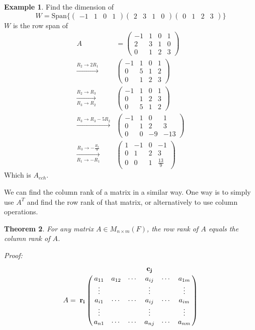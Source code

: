 \documentclass{report}
\newtheorem{theorem}{Theorem}[subsection]
\theoremstyle{remark}
\theoremstyle{definition}
\theoremstyle{definition}
\newtheorem{example}[theorem]{Example}
\theoremstyle{theorem}
\begin{document}
\begin{example}
Find the dimension of
\[W = \text{Span}\{\begin{pmatrix}-1&1&0&1\end{pmatrix}\begin{pmatrix}2&3&1&0\end{pmatrix}\begin{pmatrix}0&1&2&3\end{pmatrix}\}\]
$W$ is the row span of
\begin{align*}
A &= \begin{pmatrix}-1&1&0&1\\
2&3&1&0\\
0&1&2&3
\end{pmatrix}\\
\xrightarrow{R_2 \rightarrow 2R_1} &\begin{pmatrix}
-1&1&0&1\\
0&5&1&2\\
0&1&2&3
\end{pmatrix}\\
\xrightarrow[R_3 \rightarrow R_2]{R_2 \rightarrow R_3} & \begin{pmatrix}
-1&1&0&1\\
0&1&2&3\\
0&5&1&2
\end{pmatrix}\\
\xrightarrow{R_3 \rightarrow R_3 -5R_2} & \begin{pmatrix}
-1&1&0&1\\
0&1&2&3\\
0&0&-9&-13
\end{pmatrix}\\
\xrightarrow[R_1 \rightarrow -R_1]{R_3 \rightarrow -\frac{R_3}{9}} & \begin{pmatrix}
1&-1&0&-1\\
0&1&2&3\\
0&0&1&\frac{13}{9}
\end{pmatrix}
\end{align*}
Which is $A_{ech}$.
\end{example}
We can find the column rank of a matrix in a similar way. One way is to simply use $A^T$ and find the row rank of that matrix, or alternatively to use column operations.
\begin{theorem}
For any matrix $A \in M_{n \times m}(F)$, the row rank of $A$ equals the column rank of $A$.
\end{theorem}
\emph{Proof:}
\[ A = \bordermatrix{
&&&&\mathbf{c_j}&&\cr
&a_{11}&a_{12}&\cdots&a_{ij}&\cdots&a_{1m}\cr
&\vdots&&&\vdots&&\vdots\cr
\mathbf{r_i}&a_{i1}&\cdots&\cdots&a_{ij}&\cdots&a_{im}\cr
&\vdots&&&\vdots&&\vdots\cr
&a_{n1}&\cdots&\cdots&a_{nj}&\cdots&a_{nm}\cr
}\]
\end{document}
